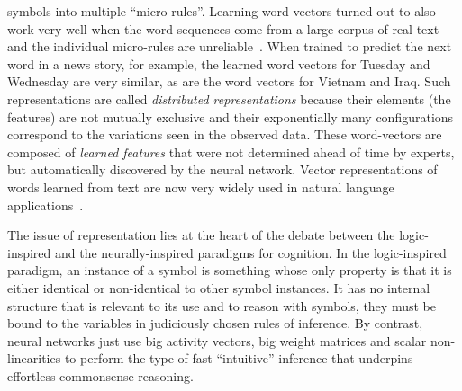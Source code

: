\documentclass[10pts]{article}
\begin{document}
symbols into multiple ``micro-rules''.  
%
Learning word-vectors turned out to also
work very well when the word sequences come from a large corpus of
real text and the individual micro-rules are
unreliable~\citep{BenDucVin01-short}. When trained to predict the next
word in a news story, for example, the learned word vectors for
Tuesday and Wednesday are very similar, as are the word vectors for
Vietnam and Iraq. 
Such representations are called {\em
  distributed representations} because their elements (the features) are
not mutually exclusive and their exponentially many configurations
correspond to
the variations seen in the observed data.  These word-vectors are
composed of
{\em learned features} that were not determined ahead of time by
experts, but automatically discovered by the neural network.  Vector
representations of words learned from text are now very widely used in
natural language
applications~\citep{Schwenk-2007,collobert:2011b,Socher-2011,
  Mikolov-et-al-NIPS2013,Bahdanau-et-al-arxiv2014,Sutskever-et-al-NIPS2014}.

The issue of representation lies at the heart of the debate between
the logic-inspired and the neurally-inspired paradigms for
cognition. In the logic-inspired paradigm, an instance of a symbol is
something whose only property is that it is either identical or
non-identical to other symbol instances. It has no internal structure
that is relevant to its use and  to reason with symbols, they must be
bound to the variables in judiciously chosen rules of inference.  By
contrast, neural networks just use big activity vectors, big weight
matrices and scalar non-linearities to perform the type of fast
``intuitive'' inference that underpins effortless commonsense
reasoning.
\end{document}
